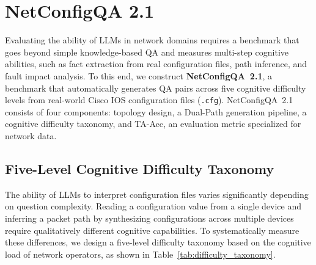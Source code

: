 
\section{NetConfigQA 2.1}

Evaluating the ability of LLMs in network domains requires a benchmark that goes beyond simple knowledge-based QA and measures multi-step cognitive abilities, such as fact extraction from real configuration files, path inference, and fault impact analysis.
To this end, we construct \textbf{NetConfigQA~2.1}, a benchmark that automatically generates QA pairs across five cognitive difficulty levels from real-world Cisco IOS configuration files (\texttt{.cfg}).
NetConfigQA~2.1 consists of four components: topology design, a Dual-Path generation pipeline, a cognitive difficulty taxonomy, and TA-Acc, an evaluation metric specialized for network data.



\subsection{Five-Level Cognitive Difficulty Taxonomy}


The ability of LLMs to interpret configuration files varies significantly depending on question complexity.
Reading a configuration value from a single device and inferring a packet path by synthesizing configurations across multiple devices require qualitatively different cognitive capabilities.
To systematically measure these differences, we design a five-level difficulty taxonomy based on the cognitive load of network operators, as shown in Table~\ref{tab:difficulty_taxonomy}.


